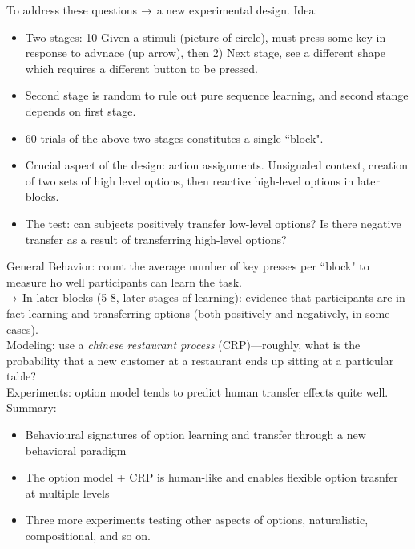 To address these questions $\rightarrow$ a new experimental design. Idea:
\begin{itemize}
    \item Two stages: 10 Given a stimuli (picture of circle), must press some key in response to advnace (up arrow), then 2) Next stage, see a different shape which requires a different button to be pressed.
    \item Second stage is random to rule out pure sequence learning, and second stange depends on first stage.
    
    \item 60 trials of the above two stages constitutes a single ``block".
    
    \item Crucial aspect of the design: action assignments. Unsignaled context, creation of two sets of high level options, then reactive high-level options in later blocks.
    
    \item The test: can subjects positively transfer low-level options? Is there negative transfer as a result of transferring high-level options?
\end{itemize}


General Behavior: count the average number of key presses per ``block" to measure ho well participants can learn the task. \\

$\rightarrow$ In later blocks (5-8, later stages of learning): evidence that participants are in fact learning and transferring options (both positively and negatively, in some cases). \\

Modeling: use a {\it chinese restaurant process} (CRP)---roughly, what is the probability that a new customer at a restaurant ends up sitting at a particular table? \\


Experiments: option model tends to predict human transfer effects quite well. \\

Summary:
\begin{itemize}
\item Behavioural signatures of option learning and transfer through a new behavioral paradigm
\item The option model + CRP is human-like and enables flexible option trasnfer at multiple levels
\item Three more experiments testing other aspects of options, naturalistic, compositional, and so on.
\end{itemize}

